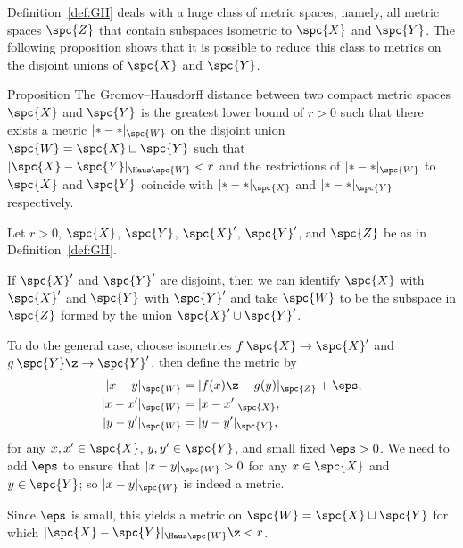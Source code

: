 Definition~\ref{def:GH} deals with a huge class of metric spaces,
namely, all metric spaces $\spc{Z}$ that contain subspaces isometric to $\spc{X}$ and $\spc{Y}$.
The following proposition shows that it is possible to reduce this class to metrics on the disjoint unions of $\spc{X}$ and $\spc{Y}$. 

\begin{thm}{Proposition}\label{prop:GH=X+Y}
The Gromov--Hausdorff distance between two compact metric spaces $\spc{X}$
and $\spc{Y}$ is the greatest lower bound of $r>0$ such that there exists a metric
$|{*}-{*}|_{\spc{W}}$ on the disjoint union $\spc{W}=\spc{X}\sqcup \spc{Y}$ 
such that $|\spc{X}-\spc{Y}|_{\Haus\spc{W}} < r$
and 
the restrictions of $|{*}-{*}|_{\spc{W}}$ to $\spc{X}$ and $\spc{Y}$
coincide with $|{*}-{*}|_\spc{X}$ and $|{*}-{*}|_{\spc{Y}}$ 
respectively. 
\end{thm}

Let $r>0$, $\spc{X}$, $\spc{Y}$, $\spc{X}'$, $\spc{Y}'$, and $\spc{Z}$ be as in Definition~\ref{def:GH}.

If  $\spc{X}'$ and $\spc{Y}'$ are disjoint, then we can identify $\spc{X}$ with  $\spc{X}'$ and $\spc{Y}$ with $\spc{Y}'$ and take $\spc{W}$ to be the subspace in $\spc{Z}$ formed by the union $\spc{X}'\cup\spc{Y}'$.

To do the general case,
choose isometries $f\: \spc{X} \to \spc{X}'$ and
$g\: \spc{Y} \z\to \spc{Y}'$, then define the metric by
\begin{align*}
|x-y|_{\spc{W}} &= |f (x)\z- g(y)|_{\spc{Z}}+\eps,
\\
|x-x'|_{\spc{W}} &= |x- x'|_{\spc{X}},
\\
|y-y'|_{\spc{W}} &= |y- y'|_{\spc{Y}},
\end{align*}
for any $x,x' \in \spc{X}$, $y,y' \in \spc{Y}$, and small fixed $\eps>0$.
We need to add $\eps$ to ensure that $|x-y|_{\spc{W}} > 0$ for any $x\in \spc{X}$ and $y\in \spc{Y}$;
so $|x-y|_{\spc{W}}$ is indeed a metric.

Since $\eps$ is small,
this yields a metric on $\spc{W}=\spc{X}\sqcup \spc{Y}$ for which
$|\spc{X}- \spc{Y}|_{\Haus\spc{W}} \z< r$.
\qeds





















